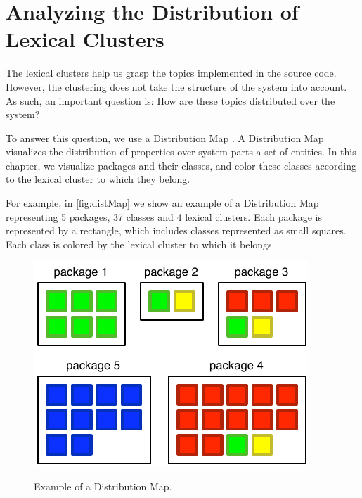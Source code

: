 \section{Analyzing the Distribution of Lexical Clusters}\label{sec:distribution}

The lexical clusters help us grasp the topics implemented in the source code. However, the clustering does not take the structure of the system into account. As such, an important question is: How are these topics distributed over the system?

To answer this question, we use a Distribution Map \cite{Tuft01a,Duca06c}. A Distribution Map visualizes the distribution of properties over system parts \ie a set of entities. In this chapter, we visualize packages and their classes, and color these classes according to the lexical cluster to which they belong.

For example, in \autoref{fig:distMap} we show an example of a Distribution Map representing 5 packages, 37 classes and 4 lexical clusters. Each package is represented by a rectangle, which includes classes represented as small squares. Each class is colored by the lexical cluster to which it belongs.

\begin{figure}[h]
    \centering
  \includegraphics[width=\columnwidth]{fig/hapax-distributionmap-example}\\
  \caption{Example of a Distribution Map.}\label{fig:distMap}
\end{figure}

